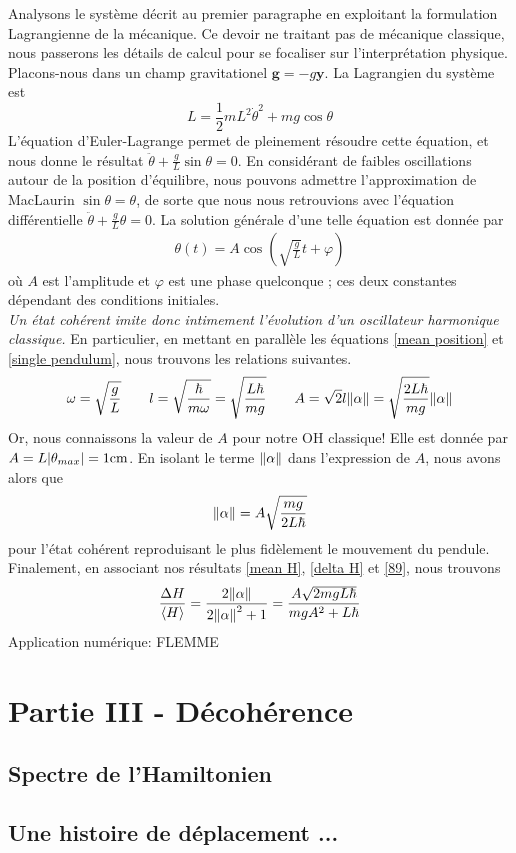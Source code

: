 \documentclass[11pt,oneside,a4paper]{article}
\newcommand{\h}{\ensuremath{\hbar}}
\begin{document}
Analysons le système décrit au premier paragraphe en exploitant la formulation Lagrangienne de la mécanique. Ce devoir ne traitant pas de mécanique classique, nous passerons les détails de calcul pour se focaliser sur l'interprétation physique. Placons-nous dans un champ gravitationel $\bm{g} = -g\bm{\bm{y}}$. La Lagrangien du système est 
\begin{equation}
  L = \frac{1}{2}mL^2\dot{\theta}^2 + mg\cos\theta 
\end{equation}
L'équation d'Euler-Lagrange permet de pleinement résoudre cette équation, et nous donne le résultat $\ddot{\theta} + \frac{g}{L}\sin\theta =  0$. En considérant de faibles oscillations autour de la position d'équilibre, nous pouvons admettre l'approximation de MacLaurin $\sin\theta=\theta$, de sorte que nous nous retrouvions avec l'équation différentielle $\ddot{\theta} + \frac{g}{L}\theta = 0$. La solution générale d'une telle équation est donnée par
\begin{align}
  \label{single pendulum}
  \theta(t) = A\cos(\sqrt{\frac{g}{L}}t+\varphi)
\end{align}
où $A$ est l'amplitude et $\varphi$ est une phase quelconque ; ces deux constantes dépendant des conditions initiales.\\

\emph{Un état cohérent imite donc intimement l'évolution d'un oscillateur harmonique classique.} En particulier, en mettant en parallèle les équations \eqref{mean position} et \eqref{single pendulum}, nous trouvons les relations suivantes.
\begin{equation}
  \omega = \sqrt{\frac{g}{L}}\qquad
  l = \sqrt{\frac{\h}{m\omega}} = \sqrt{\frac{L\h}{mg}}\qquad
  A = \sqrt{2}l\norm{\alpha} = \sqrt{\frac{2L\h}{mg}}\norm{\alpha}
\end{equation}
Or, nous connaissons la valeur de $A$ pour notre OH classique! Elle est donnée par $A = L\absolutevalue{\theta_{max}} = 1\si{cm}$. En isolant le terme $\norm{\alpha}$ dans l'expression de $A$, nous avons alors que
\begin{equation}
  \label{89}
  \norm{\alpha}= A\sqrt{\frac{mg}{2L\h}}
\end{equation}
pour l'état cohérent reproduisant le plus fidèlement le mouvement du pendule.\\

Finalement, en associant nos résultats \eqref{mean H}, \eqref{delta H} et \eqref{89}, nous trouvons
\begin{equation}
  \frac{\Delta H}{\expval{H}} = \frac{2\norm{\alpha}}{2\norm{\alpha}^2+1} = \frac{A\sqrt{2mgL\h}}{mgA^2+L\h}
\end{equation}
Application numérique: FLEMME

\section{Partie III - Décohérence}
\subsection{Spectre de l'Hamiltonien}
\subsection{Une histoire de déplacement ...}
\end{document}
